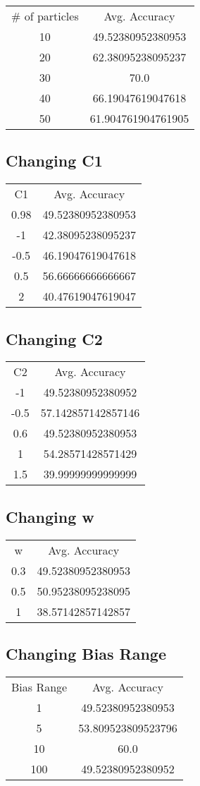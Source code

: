 \documentclass[letterpaper]{article}
\begin{document}
\begin{center}
\begin{tabular}{ |c| |c|  }
\# of particles & Avg. Accuracy\\
10 & 49.52380952380953\\
20 & 62.38095238095237\\
30 & 70.0 \\
40 & 66.19047619047618 \\
50 & 61.904761904761905 
\end{tabular}
\end{center}


\subsection{Changing C1}
\begin{center}
\begin{tabular}{ |c| |c|  }
C1 & Avg. Accuracy\\
0.98 & 49.52380952380953\\
-1 & 42.38095238095237\\
-0.5 &  46.19047619047618 \\
0.5 &  56.66666666666667\\
2 & 40.47619047619047
\end{tabular}
\end{center}

\subsection{Changing C2}
\begin{center}
\begin{tabular}{ |c| |c|  }
C2 & Avg. Accuracy\\
-1 & 49.52380952380952\\
-0.5 & 57.142857142857146\\
0.6 & 49.52380952380953\\
1 & 54.28571428571429\\
1.5 &  39.99999999999999 
\end{tabular}
\end{center}

\subsection{Changing w}
\begin{center}
\begin{tabular}{ |c| |c|  }
w & Avg. Accuracy\\
0.3 & 49.52380952380953\\
0.5 & 50.95238095238095\\
1 & 38.57142857142857
\end{tabular}
\end{center}

\subsection{Changing Bias Range}
\begin{center}
\begin{tabular}{ |c| |c|  }
Bias Range & Avg. Accuracy\\
1 & 49.52380952380953\\
5 & 53.809523809523796\\
10 & 60.0 \\
100 & 49.52380952380952
\end{tabular}
\end{center}
\end{document}
